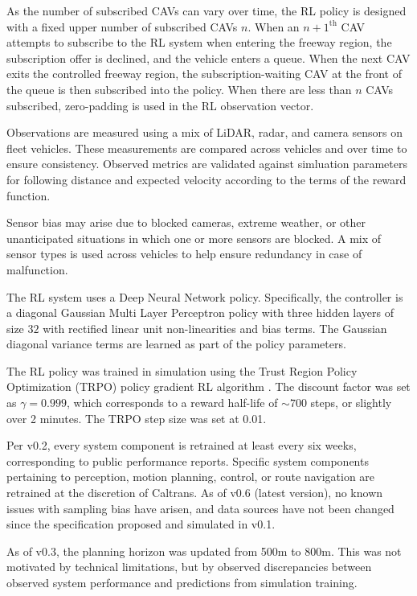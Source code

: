 \documentclass[12pt, a4paper, twocolumn]{article}
\begin{document}
\begin{multicols}{2}
{As the number of subscribed CAVs can vary over time, the RL policy is designed with a fixed upper number of subscribed CAVs $n$.
When an $n+1^\text{th}$ CAV attempts to subscribe to the RL system when entering the freeway region, the subscription offer is declined, and the vehicle enters a queue.
When the next CAV exits the controlled freeway region, the subscription-waiting CAV at the front of the queue is then subscribed into the policy.
When there are less than $n$ CAVs subscribed, zero-padding is used in the RL observation vector.

}{%

Observations are measured using a mix of LiDAR, radar, and camera sensors on fleet vehicles. 
These measurements are compared across vehicles and over time to ensure consistency.
Observed metrics are validated against simluation parameters for following distance and expected velocity according to the terms of the reward function.

Sensor bias may arise due to blocked cameras, extreme weather, or other unanticipated situations in which one or more sensors are blocked.
A mix of sensor types is used across vehicles to help ensure redundancy in case of malfunction.

}{%

The RL system uses a Deep Neural Network policy.
Specifically, the controller is a diagonal Gaussian Multi Layer Perceptron policy with three hidden layers of size $32$ with rectified linear unit non-linearities and bias terms.
The Gaussian diagonal variance terms are learned as part of the policy parameters.

The RL policy was trained in simulation using the Trust Region Policy Optimization (TRPO) policy gradient RL algorithm \cite{schulman2015trust}.
The discount factor was set as $\gamma=0.999$, which corresponds to a reward half-life of $\sim 700$ steps, or slightly over 2 minutes.
The TRPO step size was set at 0.01.

}{%

Per v0.2, every system component is retrained at least every six weeks, corresponding to public performance reports.
Specific system components pertaining to perception, motion planning, control, or route navigation are retrained at the discretion of Caltrans.
As of v0.6 (latest version), no known issues with sampling bias have arisen, and data sources have not been changed since the specification proposed and simulated in v0.1.

}{%

As of v0.3, the planning horizon was updated from 500m to 800m. This was not motivated by technical limitations, but by observed discrepancies between observed system performance and predictions from simulation training.

}
\end{multicols}
\end{document}
